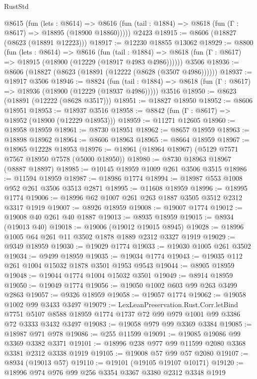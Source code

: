 \begin{lexlean}{RustStd}
\begin{coremodule}
    @8615
      (fun (lets : @8614) =>
      @8616 (fun (tail : @1884) => @8618 (fun (Γ : @8617) => @18895 (@18900 @18860)))))
    @2423
@18915 := @8606 (@18827 (@8623 (@18891 @12223)))
@18917 := @12230 @18855 @13062
@18929 := @8800
    (fun (lets : @8614) =>
    @8616
      (fun (tail : @1884) =>
      @8618 (fun (Γ : @8617) => @18915 (@18900 (@12229 (@18917 @4983 @4986))))))
    @3506
@18936 := @8606 (@18827 (@8623 (@18891 (@12222 (@8628 (@3507 @4986))))))
@18937 := @18917 @3506
@18946 := @8824
    (fun (tail : @1884) => @8618 (fun (Γ : @8617) => @18936 (@18900 (@12229 (@18937 @4986)))))
    @3516
@18950 := @8623 (@18891 (@12222 (@8628 @3517)))
@18951 := @18827 @18950
@18952 := @8606 @18951
@18953 := @18937 @3516
@18958 := @8842 (fun (Γ : @8617) => @18952 (@18900 (@12229 @18953)))
@18959 := @11271 @12605
@18960 := @18958 @18959
@18961 := @8730 @18951
@18962 := @8657 @18959
@18963 := @18898 @18962
@18964 := @8606 @18963
@18965 := @8664 @18959
@18967 := @18965 @12228 @18953
@18976 := @18961 (@18964 @18967) (@5129 @7571 @7567 @18950 @7578 (@5000 @18950))
@18980 := @8730 @18963 @18967 (@8887 @18897)
@18985 := @10145 @18959 @1009 @261 @3506 @3515
@18986 := @11594 @18959
@18987 := @18986 @1774
@18994 := @18987 @553 @1008 @952 @261 @3506 @3513 @2871
@18995 := @11608 @18959
@18996 := @18995 @1774
@19006 := @18996 @62 @1007 @261 @263 @1887 @3505 @3512 @2312 @3317 @1919
@19007 := @8926 @18959
@19008 := @19007 @1774
@19012 := @19008 @40 @261 @40 @1887
@19013 := @8935 @18959
@19015 := @8934 (@19013 @40)
@19018 := @19006 (@19012 @19015 @8945)
@19028 := @18996 @1005 @64 @261 @11 @3502 @1878 @1889 @2312 @3327 @1919
@19029 := @9349 @18959
@19030 := @19029 @1774
@19033 := @19030 @1005 @261 @3502
@19034 := @9499 @18959
@19035 := @19034 @1774
@19043 := @19035 @112 @261 @1004 @15032 @1878 @3501 @1953 @9543
@19044 := @8905 @18959
@19048 := @19044 @1774 @1004 @15032 @3501
@19049 := @8914 @18959
@19050 := @19049 @1774
@19056 := @19050 @1002 @603 @99 @263 @3499 @2863
@19057 := @9326 @18959
@19058 := @19057 @1774
@19062 := @19058 @1002 @99 @3433 @3497
@19079 := LexLeanPreservation.Rust.Corr.letBind
    @7751
    @5107
    @8588
    @18959
    @1774
    @1737
    @72
    @99
    @979
    @1001
    @99
    @3386
    @72
    @3333
    @3432
    @3497
@19083 := @19058 @979 @99 @3369 @3384
@19085 := @18987 @971 @978
@19086 := @255 @11599
@19091 := @19085 @19086 @99 @3369 @3382 @3371
@19101 := @18996 @238 @977 @99 @11599 @2080 @3368 @3381 @2312 @3338 @1919
@19105 := @19008 @57 @99 @57 @2080
@19107 := @8934 (@19013 @57)
@19110 := @19101 (@19105 @19107 @10171)
@19120 := @18996 @974 @976 @99 @256 @3354 @3367 @3380 @2312 @3348 @1919

\end{coremodule}
\end{lexlean}
